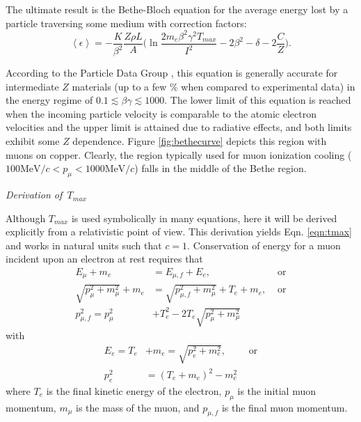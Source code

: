 The ultimate result is the Bethe-Bloch equation for the average energy lost by a particle traversing some medium with correction factors:
\begin{equation}\label{eqn:bethebloch}
\left< \epsilon \right> = -\frac{K}{\beta^2}\frac{Z\rho L}{A}\Big(\ln{\frac{2m_e \beta ^2 \gamma ^2 T_{max}}{I^2}}-2\beta^2-\delta-2\frac{C}{Z}\Big).
\end{equation}

According to the Particle Data Group \cite{PDG}, this equation is generally accurate for intermediate $Z$ materials (up to a few \% when compared to experimental data) in the energy regime of $0.1 \lesssim \beta \gamma \lesssim 1000$. The lower limit of this equation is reached when the incoming particle velocity is comparable to the atomic electron velocities and the upper limit is attained due to radiative effects, and both limits exhibit some $Z$ dependence. Figure \ref{fig:bethecurve} depicts this region with muons on copper. Clearly, the region typically used for muon ionization cooling ($100 \text{MeV/}c < p_\mu < 1000 \text{MeV/}c$) falls in the middle of the Bethe region.

\vspace{24pt}
\noindent \textit{\large{Derivation of $\,T_{max}$}}
\vspace{12pt}

Although $T_{max}$ is used symbolically in many equations, here it will be derived explicitly from a relativistic point of view. This derivation yields Eqn. \ref{eqn:tmax} and works in natural units such that $c=1$. Conservation of energy for a muon incident upon an electron at rest requires that 
\begin{align}
E_\mu+m_e&=E_{\mu,f}+E_e,&\text{ or} \nonumber\\
\sqrt{p_\mu ^2+m_\mu ^2}+m_e &= \sqrt{p_{\mu,f}^2+m_\mu ^2}+T_e+m_e,&\text{ or} \nonumber \\
p_{\mu,f}^2 =p_\mu^2 &+T_e^2-2T_e\sqrt{p_\mu ^2 + m_\mu^2} \label{eqn:TMaxEnergy1}
\end{align}
with
\begin{align}
E_e=T_e&+m_e = \sqrt{p_e ^2+m_e^2},\qquad\text{ or} \nonumber\\
p_e ^2&=(T_e+m_e)^2-m_e^2 \label{eqn:TMaxEnergy2}
\end{align}
where $T_e$ is the final kinetic energy of the electron, $p_\mu$ is the initial muon momentum, $m_\mu$ is the mass of the muon, and $p_{\mu,f}$ is the final muon momentum. 

